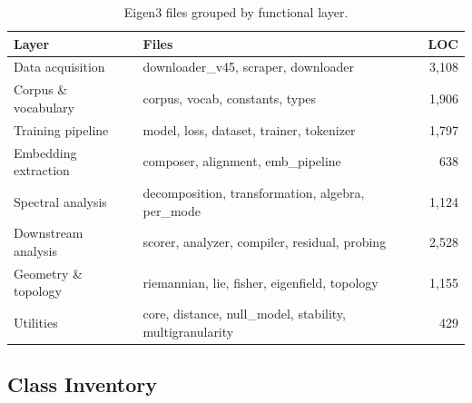 \documentclass[11pt,a4paper]{article}
\begin{document}
\begin{table}[H]
\centering
\caption{Eigen3 files grouped by functional layer.}
\begin{tabular}{@{}llr@{}}
\toprule
\textbf{Layer} & \textbf{Files} & \textbf{LOC} \\
\midrule
Data acquisition & downloader\_v45, scraper, downloader & 3{,}108 \\
Corpus \& vocabulary & corpus, vocab, constants, types & 1{,}906 \\
Training pipeline & model, loss, dataset, trainer, tokenizer & 1{,}797 \\
Embedding extraction & composer, alignment, emb\_pipeline & 638 \\
Spectral analysis & decomposition, transformation, algebra, per\_mode & 1{,}124 \\
Downstream analysis & scorer, analyzer, compiler, residual, probing & 2{,}528 \\
Geometry \& topology & riemannian, lie, fisher, eigenfield, topology & 1{,}155 \\
Utilities & core, distance, null\_model, stability, multigranularity & 429 \\
\bottomrule
\end{tabular}
\end{table}

\subsection{Class Inventory}
\end{document}
